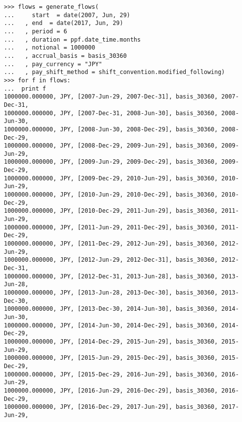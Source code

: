 \begin{verbatim}
>>> flows = generate_flows(
...     start  = date(2007, Jun, 29)
...   , end  = date(2017, Jun, 29)
...   , period = 6
...   , duration = ppf.date_time.months
...   , notional = 1000000
...   , accrual_basis = basis_30360
...   , pay_currency = "JPY"
...   , pay_shift_method = shift_convention.modified_following)
>>> for f in flows:
...  print f
1000000.000000, JPY, [2007-Jun-29, 2007-Dec-31], basis_30360, 2007-Dec-31, 
1000000.000000, JPY, [2007-Dec-31, 2008-Jun-30], basis_30360, 2008-Jun-30, 
1000000.000000, JPY, [2008-Jun-30, 2008-Dec-29], basis_30360, 2008-Dec-29, 
1000000.000000, JPY, [2008-Dec-29, 2009-Jun-29], basis_30360, 2009-Jun-29, 
1000000.000000, JPY, [2009-Jun-29, 2009-Dec-29], basis_30360, 2009-Dec-29, 
1000000.000000, JPY, [2009-Dec-29, 2010-Jun-29], basis_30360, 2010-Jun-29, 
1000000.000000, JPY, [2010-Jun-29, 2010-Dec-29], basis_30360, 2010-Dec-29, 
1000000.000000, JPY, [2010-Dec-29, 2011-Jun-29], basis_30360, 2011-Jun-29, 
1000000.000000, JPY, [2011-Jun-29, 2011-Dec-29], basis_30360, 2011-Dec-29, 
1000000.000000, JPY, [2011-Dec-29, 2012-Jun-29], basis_30360, 2012-Jun-29, 
1000000.000000, JPY, [2012-Jun-29, 2012-Dec-31], basis_30360, 2012-Dec-31, 
1000000.000000, JPY, [2012-Dec-31, 2013-Jun-28], basis_30360, 2013-Jun-28, 
1000000.000000, JPY, [2013-Jun-28, 2013-Dec-30], basis_30360, 2013-Dec-30, 
1000000.000000, JPY, [2013-Dec-30, 2014-Jun-30], basis_30360, 2014-Jun-30, 
1000000.000000, JPY, [2014-Jun-30, 2014-Dec-29], basis_30360, 2014-Dec-29, 
1000000.000000, JPY, [2014-Dec-29, 2015-Jun-29], basis_30360, 2015-Jun-29, 
1000000.000000, JPY, [2015-Jun-29, 2015-Dec-29], basis_30360, 2015-Dec-29, 
1000000.000000, JPY, [2015-Dec-29, 2016-Jun-29], basis_30360, 2016-Jun-29, 
1000000.000000, JPY, [2016-Jun-29, 2016-Dec-29], basis_30360, 2016-Dec-29, 
1000000.000000, JPY, [2016-Dec-29, 2017-Jun-29], basis_30360, 2017-Jun-29, 
\end{verbatim}

